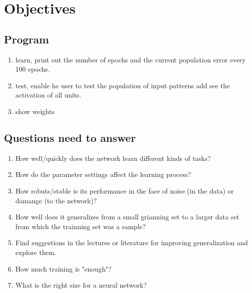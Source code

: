 \documentclass[11pt]{article}
\begin{document}
\section{Objectives}
\label{sec-6}
\subsection{Program}
\label{sec-6-1}
\begin{enumerate}
\item learn, print out the number of epochs and the current population error every 100 epochs.
\item test, enable he user to test the population of input patterns add see the activation of all units.
\item show weights
\end{enumerate}

\subsection{Questions need to answer}
\label{sec-6-2}
\begin{enumerate}
\item How well/quickly does the network learn different kinds of tasks?
\item How do the parameter settings affect the learning process?
\item How robuts/stable is its performance in the face of noise (in the data) or damange (to the network)?
\item How well does it generalizes from a small grianning set to a larger data set from which the trainning set was a sample?
\item Find suggestions in the lectures or literature for improving generalization and explore them.
\item How much training is "enough"?
\item What is the right size for a neural network?
\end{enumerate}
\end{document}
